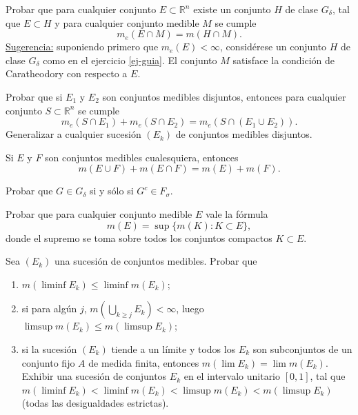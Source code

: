 \documentclass{book}
\newcommand{\rr}{\mathbb{R}}
\newcommand{\di}{\displaystyle}
\begin{document}
  \begin{ejer}{}
	Probar que para cualquier  conjunto $E \subset \rr^n$ existe un conjunto $H$ de
  clase $G_{\delta}$, tal que $E \subset H$ y para cualquier conjunto medible $M$ se cumple
  $$m_e(E \cap M)=m(H\cap M).$$
  \underline{Sugerencia:} suponiendo primero que $m_e(E)<\infty$, considérese un conjunto
  $H$ de clase $G_{\delta}$ como en el ejercicio \ref{ej-guia}. El conjunto $M$ satisface la
  condición de Caratheodory con respecto a $E$.
   \end{ejer} 

   \begin{ejer}{}
	Probar que si $E_1$ y $E_2$ son conjuntos medibles disjuntos, entonces para cualquier
  conjunto $S \subset \rr^n$ se cumple 
  $$m_e(S\cap E_1)+m_e(S\cap E_2)=m_e(S\cap(E_1\cup E_2)). $$
  Generalizar a cualquier sucesión $(E_k)$ de conjuntos medibles disjuntos.
   \end{ejer} 


	 \begin{ejer}{} 
 Si $E$ y $F$ son conjuntos medibles cualesquiera, entonces
  $$m(E \cup F)+m(E \cap F)=m(E)+m(F).$$
	\end{ejer} 

   \begin{ejer}{}  Probar que $G \in G_{\delta}$ si y sólo si $G^c \in F_{\sigma}$.
	\end{ejer} 
%
%

    \begin{ejer}{} 
	Probar que para cualquier conjunto medible $E$ vale la fórmula
   $$m(E)=\sup\{m(K):K\subset E\}, $$
   donde el supremo se toma sobre todos los conjuntos compactos $K \subset E$.
\end{ejer} 

   \begin{ejer}{} 
	Sea $(E_k)$ una sucesión de conjuntos medibles. Probar que
	\begin{enumerate}
    \item $m(\liminf E_k)\leq \liminf m(E_k)$;
    \item si para alg\'un $j$, \;$m(\di\bigcup_{k\geq j}E_k)<\infty$, luego\; 
    $\limsup m(E_k)\leq m(\limsup E_k)$;
    \item si la sucesión $(E_k)$ tiende a un límite y todos los $E_k$ son subconjuntos
    de un conjunto fijo $A$ de medida finita, entonces \;$m(\lim E_k)=\lim m(E_k)$.
    \\
    Exhibir una sucesión de conjuntos $E_k$ en el intervalo unitario $[0,1]$, tal que 
    $m(\liminf E_k)<\liminf m(E_k)<\limsup m(E_k)<m(\limsup E_k)$  (todas las desigualdades estrictas).
	\end{enumerate}
	\end{ejer} 
\end{document}
